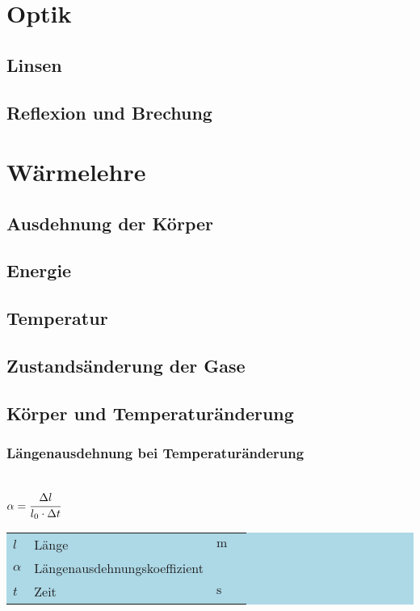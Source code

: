 \documentclass[a4paper, 11pt]{article}
\newcommand\mainformular[1]{\fbox{#1}}      %
\newcommand\legende[1]{
    \colorbox{lightblue}{%
    \begin{tabular}{llll}
     #1
    \end{tabular}
    }
}                                           %
\begin{document}
\section{Optik}

\subsection{Linsen}


\subsection{Reflexion und Brechung}


\section{Wärmelehre}

\subsection{Ausdehnung der Körper}


\subsection{Energie}


\subsection{Temperatur}


\subsection{Zustandsänderung der Gase}


\subsection{Körper und Temperaturänderung}
\subsubsection{Längenausdehnung bei Temperaturänderung}
\begin{minipage}{0.45\textwidth}
\mainformular{$\Delta l = \alpha \cdot l_0 \cdot \Delta t$}  \\
$\alpha = \cfrac{\Delta l}{l_0 \cdot \Delta t}$
\end{minipage}
\begin{minipage}{0.45\textwidth}

\legende{
$l$ & Länge & $\si{\meter} $ & $ $ \\
$\alpha$ & Längenausdehnungskoeffizient &  & \\
$t$ & Zeit & $\si{\second}$ & \\
}

\end{minipage}
\end{document}
